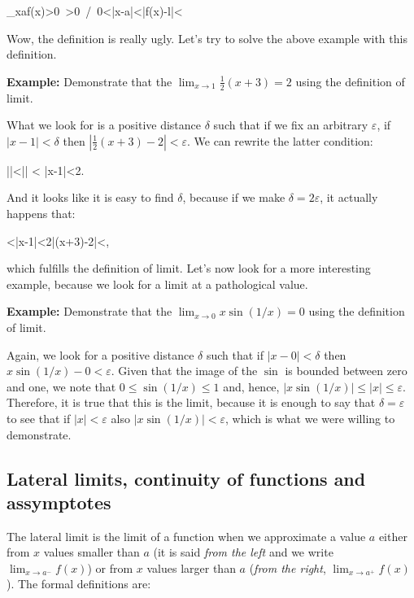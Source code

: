 \bnn
\lim_{x\rightarrow a}f(x)\Leftrightarrow\forall\varepsilon>0\ \exists\delta>0\ /\ 0<|x-a|<\delta\Rightarrow |f(x)-l|<\varepsilon
\enn
\vs

Wow, the definition is really ugly. Let's try to solve the above example with this definition.

{\bf Example:} Demonstrate that the $\lim_{x\rightarrow 1} \frac{1}{2}(x+3)=2$ using the definition of limit.

What we look for is a positive distance $\delta$ such that if we fix an arbitrary $\varepsilon$, if $|x-1|<\delta$ then $ |\frac{1}{2}(x+3)-2|<\varepsilon$. We can rewrite the latter condition:

\bnn
 ||<\varepsilon \Rightarrow || < \varepsilon \Rightarrow |x-1|<2\varepsilon.
\enn

And it looks like it is easy to find $\delta$, because if we make $\delta = 2\varepsilon$, it actually happens that:

<|x-1|<2\varepsilon \Rightarrow |(x+3)-2|<\varepsilon,
\enn

which fulfills the definition of limit. Let's now look for a more interesting example, because
we look for a limit at a pathological value.

{\bf Example:} Demonstrate that the $\lim_{x\rightarrow 0} x\sin(1/x)=0$ using the definition of limit.

Again, we look for a positive distance $\delta$ such that if $|x-0|<\delta$ then 
$x\sin(1/x)-0 < \varepsilon$. Given that the image of the $\sin$ is bounded between
zero and one, we note that $0 \leq \sin(1/x)\leq 1$ and, hence, $|x\sin(1/x)|\leq |x| \leq \varepsilon$. Therefore, it is true that this is the limit, because it is enough to say that
$\delta = \varepsilon$ to see that if $|x| < \varepsilon$ also $|x\sin(1/x)|<\varepsilon$,
which is what we were willing to demonstrate.

\subsection{Lateral limits, continuity of functions and assymptotes}

The lateral limit is the limit of a function when we approximate a value $a$ either from $x$ values smaller than $a$ (it is said \emph{from the left} and we write $\lim_{x\rightarrow a^{-}}f(x)$) or from $x$ values larger than $a$ (\emph{from the right}, $\lim_{x\rightarrow a^{+}}f(x)$). The
formal definitions are:

